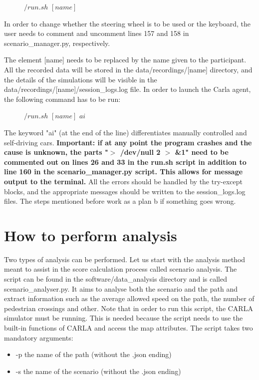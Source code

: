 \begin{figure} [h]
\centering
        $/run.sh$ $[name]$
\end{figure}
In order to change whether the steering wheel is to be used or the keyboard, the user needs to comment and uncomment lines 157 and 158 in scenario\_manager.py, respectively. 

The element [name] needs to be replaced by the name given to the participant. All the recorded data will be stored in the data/recordings/[name] directory, and the details of the simulations will be visible in the data/recordings/[name]/session\_logs.log file. In order to launch the Carla agent, the following command has to be run:

\begin{figure} [h]
    \centering
    $/run.sh$ $[name]$ $ai$
\end{figure}

The keyword "ai" (at the end of the line) differentiates manually controlled and self-driving cars. \textbf{Important: if at any point the program crashes and the cause is unknown, the parts "$>$ /dev/null 2 $>$ \&1" need to be commented out on lines 26 and 33 in the run.sh script in addition to line 160 in the scenario\_manager.py script. This allows for message output to the terminal.} All the errors should be handled by the try-except blocks, and the appropriate messages should be written to the session\_logs.log files. The steps mentioned before work as a plan b if something goes wrong.

\section{How to perform analysis} \label{sect:b.4}
Two types of analysis can be performed. Let us start with the analysis method meant to assist in the score calculation process called scenario analysis. The script can be found in the software/data\_analysis directory and is called scenario\_analyser.py. It aims to analyse both the scenario and the path and extract information such as the average allowed speed on the path, the number of pedestrian crossings and other. Note that in order to run this script, the CARLA simulator must be running. This is needed because the script needs to use the built-in functions of CARLA and access the map attributes. The script takes two mandatory arguments:

\begin{itemize}
  \item -p the name of the path (without the .json ending)
  \item -s the name of the scenario (without the .json ending)
\end{itemize}

